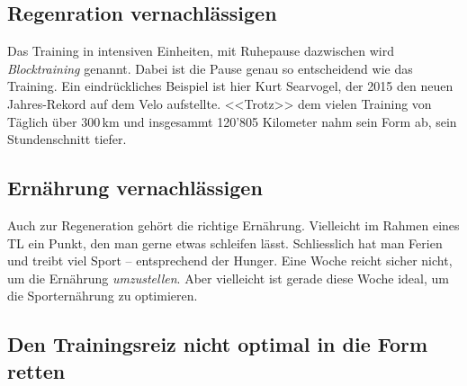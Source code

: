 \documentclass[a4paper,DIV13,BCOR0cm,draft=TRUE]{scrartcl}
\begin{document}
\subsection{Regenration vernachlässigen}

Das Training in intensiven Einheiten, mit Ruhepause dazwischen wird \emph{Blocktraining} genannt.
Dabei ist die Pause genau so entscheidend wie das Training.
Ein eindrückliches Beispiel ist hier Kurt Searvogel, der 2015 den neuen Jahres-Rekord auf dem Velo aufstellte.
<<Trotz>> dem vielen Training von Täglich über 300\,km und insgesammt 120'805 Kilometer nahm sein Form ab,
sein Stundenschnitt tiefer.

\subsection{Ernährung vernachlässigen}

Auch zur Regeneration gehört die richtige Ernährung.
Vielleicht im Rahmen eines TL ein Punkt, den man gerne etwas schleifen lässt.
Schliesslich hat man Ferien und treibt viel Sport -- entsprechend der Hunger.
Eine Woche reicht sicher nicht, um die Ernährung \emph{umzustellen}.
Aber vielleicht ist gerade diese Woche ideal, um die Sporternährung zu optimieren.

\subsection{Den Trainingsreiz nicht optimal in die Form retten}



% 

\end{document}
